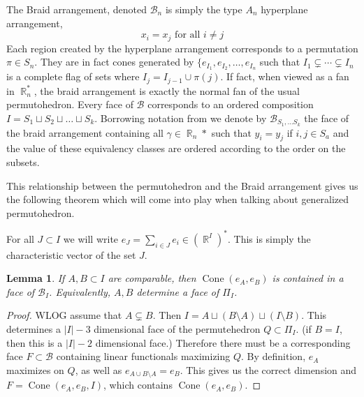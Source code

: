 \documentclass[12pt]{amsart}
\newtheorem{lemma}{Lemma}[section]
\numberwithin{equation}{section}
\newcommand{\C}{\operatorname{Cone}}
\newcommand{\RR}{\operatorname{\mathbb{R}}}
\newcommand{\bb}{\mathcal{B}}
\begin{document}


 The Braid arrangement, denoted $\bb_n$ is simply the type $A_n$ hyperplane arrangement, 
$$ x_i= x_j  \text{  for all  }  i\neq j$$
Each region created by the hyperplane arrangement corresponds to a permutation $\pi\in S_n$.  They are in fact
cones generated by  $\{ e_{I_1},  e_{I_2}, \dots , e_{I_n}$ such that $I_1\subsetneq \cdots \subsetneq I_n$ is a complete
flag of sets where $I_j = I_{j-1}\cup \pi(j)$.  If fact, when viewed as a fan in $\RR^*_n$, the braid arrangement is exactly 
the normal fan of the usual permutohedron.  Every face of $\bb$ corresponds to an ordered composition
$I = S_1\sqcup S_2 \sqcup \dots \sqcup S_k$.   Borrowing notation from \cite{HopfMonoid} we denote by $\bb_{S_1, \dots  S_k}$
the face of the braid arrangement containing all $\gamma \in \RR_n*$ such that $y_i=y_j$ if $i,j\in S_a$ and the value of these
equivalency classes are ordered according to the order on the subsets.  

This relationship between the permutohedron and the Braid arrangement gives us the following theorem which will come
into play when talking about generalized permutohedron. 


For all $J\subset I$ we will write $e_J = \sum_{i\in J} e_i\in (\RR^I)^*$.  This is simply the characteristic vector of the set $J$. 

\begin{lemma}

   If $A,B\subset I$ are comparable, then $\C(e_A, e_B)$ is contained in a face of $\bb_I$.  Equivalently, $A, B$ determine
a face of $\Pi_{I}$. 
\end{lemma}

\begin{proof}
WLOG assume that $A\subsetneq B$.    Then $I = A\sqcup (B\setminus A) \sqcup (I\setminus B) $.  This determines
a $|I|-3$ dimensional face of the permutehedron $Q\subset \Pi_{I} $. (if $B=I$, then this is a $|I|-2$ dimensional face.) Therefore
there must be a corresponding face  $F\subset \bb$ containing linear functionals maximizing $Q$. 
By definition, $e_A$ maximizes on $Q$, as well as $e_{A\cup B\setminus A}= e_B$.   This gives us the correct 
dimension and $F  = \C(e_A, e_B, I)$,  
which contains $\C(e_A, e_B)$.  
\end{proof}
\end{document}
